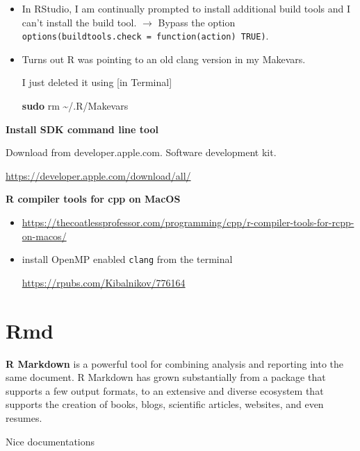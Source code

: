 \documentclass[
  a4paper,
  twoside,
  openright]{book}
\newenvironment{Shaded}{\begin{snugshade}}{\end{snugshade}}
\newcommand{\FunctionTok}[1]{\textcolor[rgb]{0.13,0.29,0.53}{\textbf{#1}}}
\newcommand{\NormalTok}[1]{#1}
\theoremstyle{definition}
\theoremstyle{definition}
\theoremstyle{definition}
\theoremstyle{definition}
\theoremstyle{remark}
\begin{document}
\begin{itemize}
\item
  In RStudio, I am continually prompted to install additional build tools and I can't install the build tool. \(\rightarrow\) Bypass the option \texttt{options(buildtools.check\ =\ function(action)\ TRUE)}.
\item
  Turns out R was pointing to an old clang version in my Makevars.

  I just deleted it using {[}in Terminal{]}

\begin{Shaded}
\begin{Highlighting}[]
\FunctionTok{sudo}\NormalTok{ rm \textasciitilde{}/.R/Makevars}
\end{Highlighting}
\end{Shaded}
\end{itemize}

\textbf{Install SDK command line tool}

Download from developer.apple.com. Software development kit.

\url{https://developer.apple.com/download/all/}

\textbf{R compiler tools for cpp on MacOS}

\begin{itemize}
\item
  \url{https://thecoatlessprofessor.com/programming/cpp/r-compiler-tools-for-rcpp-on-macos/}
\item
  install OpenMP enabled \texttt{clang} from the terminal

  \url{https://rpubs.com/Kibalnikov/776164}
\end{itemize}

\chapter{Rmd}\label{rmd}

\textbf{R Markdown} is a powerful tool for combining analysis and reporting into the same document. R Markdown has grown substantially from a package that supports a few output formats, to an extensive and diverse ecosystem that supports the creation of books, blogs, scientific articles, websites, and even resumes.

Nice documentations
\end{document}
